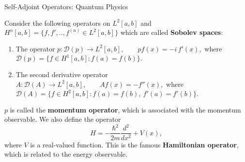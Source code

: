 \documentclass[9pt, aspectratio=169]{beamer}
\begin{document}
\begin{frame}{Self-Adjoint Operators: Quantum Physics}
\begin{example}
Consider the following operators on $L^2[a,b]$ and $H^n[a,b]=\{f,f',..,f^{(n)} \in L^2[a,b]\}$ which are called \textbf{Sobolev spaces}:
\pause
\begin{enumerate}
    \item The  operator
    $
    p:\mathcal{D}(p)\to L^2[a,b], \qquad pf(x)=-i\,f'(x),
    $
    where
    $
    \mathcal{D}(p)=\{f\in H^1[a,b]: f(a)=f(b)\}.
    $
\pause
    \item The second derivative operator
    $
    A:\mathcal{D}(A)\to L^2[a,b], \qquad Af(x)=-f''(x),
    $
    where
    $
    \mathcal{D}(A)=\{f\in H^2[a,b]: f(a)=f(b),\ f'(a)=f'(b)\}.
    $
    \pause
\end{enumerate}
\end{example}



\begin{tcolorbox}[colback=red!5, colframe=red!60!black, title=Quantum Physics]
$p$ is called the \textbf{momentum operator}, which is associated with the momentum observable.
\pause
We also define the operator
\[
H=-\frac{\hbar^2}{2m}\frac{d^2}{dx^2}+V(x),
\]
where $V$ is a real-valued function. This is the famous \textbf{Hamiltonian operator}, which is related to the energy observable.
\end{tcolorbox} 



\end{frame}
\end{document}
